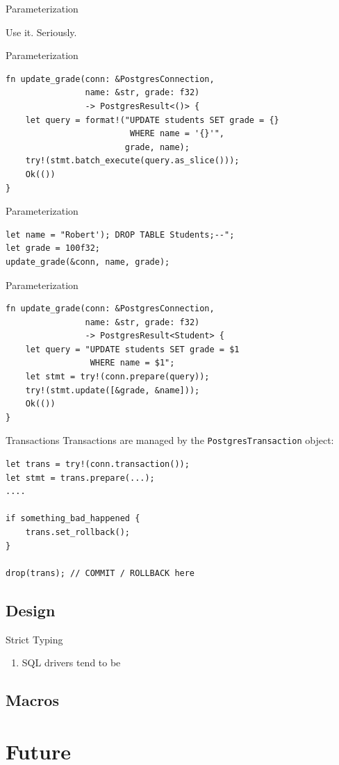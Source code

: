 \documentclass{beamer}
\begin{document}
\begin{frame}[fragile]{Parameterization}
    \begin{center}
        Use it. Seriously.
    \end{center}
\end{frame}

\begin{frame}[fragile]{Parameterization}
    \begin{verbatim}
fn update_grade(conn: &PostgresConnection,
                name: &str, grade: f32)
                -> PostgresResult<()> {
    let query = format!("UPDATE students SET grade = {}
                         WHERE name = '{}'",
                        grade, name);
    try!(stmt.batch_execute(query.as_slice()));
    Ok(())
}
    \end{verbatim}
\end{frame}

\begin{frame}[fragile]{Parameterization}
    \begin{verbatim}
let name = "Robert'); DROP TABLE Students;--";
let grade = 100f32;
update_grade(&conn, name, grade);
    \end{verbatim}
\end{frame}

\begin{frame}[fragile]{Parameterization}
    \begin{verbatim}
fn update_grade(conn: &PostgresConnection,
                name: &str, grade: f32)
                -> PostgresResult<Student> {
    let query = "UPDATE students SET grade = $1
                 WHERE name = $1";
    let stmt = try!(conn.prepare(query));
    try!(stmt.update([&grade, &name]));
    Ok(())
}
    \end{verbatim}
\end{frame}

\begin{frame}[fragile]{Transactions}
    Transactions are managed by the \verb!PostgresTransaction! object:
    \begin{verbatim}
let trans = try!(conn.transaction());
let stmt = trans.prepare(...);
....

if something_bad_happened {
    trans.set_rollback();
}

drop(trans); // COMMIT / ROLLBACK here
    \end{verbatim}
\end{frame}

\subsection{Design}

\begin{frame}{Strict Typing}
    \begin{enumerate}
        \item SQL drivers tend to be 
    \end{enumerate}
\end{frame}

\subsection{Macros}

\section{Future}
\end{document}
